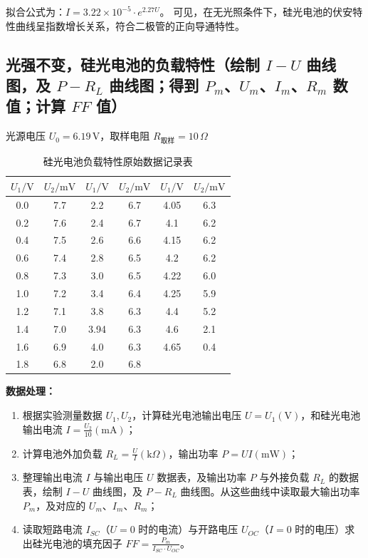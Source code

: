 \documentclass[11pt]{article}
\begin{document}
拟合公式为：$I = 3.22 \times 10^{-5} \cdot e^{2.27 U}$。
可见，在无光照条件下，硅光电池的伏安特性曲线呈指数增长关系，符合二极管的正向导通特性。

\subsection{光强不变，硅光电池的负载特性（绘制 $I-U$ 曲线图，及 $P-R_L$ 曲线图；得到 $P_m$、$U_m$、$I_m$、$R_m$ 数值；计算 $FF$ 值）}

光源电压 $U_0 = 6.19\,\text{V}$，取样电阻 $R_{\text{取样}} = 10\,\Omega$

\begin{table}[htbp]
    \centering
    \caption{硅光电池负载特性原始数据记录表}
    \label{tab:load_raw}
    \begin{tabular}{cc|cc|cc}
        \toprule
        $U_1 / \text{V}$ & $U_2 / \text{mV}$ & $U_1 / \text{V}$ & $U_2 / \text{mV}$ & $U_1 / \text{V}$ & $U_2 / \text{mV}$ \\
        \midrule
        0.0 & 7.7 & 2.2 & 6.7 & 4.05 & 6.3 \\
        0.2 & 7.6 & 2.4 & 6.7 & 4.1  & 6.2 \\
        0.4 & 7.5 & 2.6 & 6.6 & 4.15 & 6.2 \\
        0.6 & 7.4 & 2.8 & 6.5 & 4.2  & 6.2 \\
        0.8 & 7.3 & 3.0 & 6.5 & 4.22 & 6.0 \\
        1.0 & 7.2 & 3.4 & 6.4 & 4.25 & 5.9 \\
        1.2 & 7.1 & 3.8 & 6.3 & 4.4  & 5.2 \\
        1.4 & 7.0 & 3.94 & 6.3 & 4.6  & 2.1 \\
        1.6 & 6.9 & 4.0 & 6.3 & 4.65 & 0.4 \\
        1.8 & 6.8 & 2.0 & 6.8 & & \\
        \bottomrule
    \end{tabular}
\end{table}

\textbf{数据处理：}
\begin{enumerate}
    \item[(1)] 根据实验测量数据 $U_1, U_2$，计算硅光电池输出电压 $U = U_1(\text{V})$，和硅光电池输出电流 $I = \frac{U_2}{10}(\text{mA})$；
    \item[(2)] 计算电池外加负载 $R_L = \frac{U}{I}(\text{k}\Omega)$，输出功率 $P = UI(\text{mW})$；
    \item[(3)] 整理输出电流 $I$ 与输出电压 $U$ 数据表，及输出功率 $P$ 与外接负载 $R_L$ 的数据表，绘制 $I-U$ 曲线图，及 $P-R_L$ 曲线图。从这些曲线中读取最大输出功率 $P_m$，及对应的 $U_m$、$I_m$、$R_m$；
    \item[(4)] 读取短路电流 $I_{SC}$（$U=0$ 时的电流）与开路电压 $U_{OC}$（$I=0$ 时的电压）求出硅光电池的填充因子 $FF = \frac{P_m}{I_{SC} \cdot U_{OC}}$。
\end{enumerate}
\end{document}

